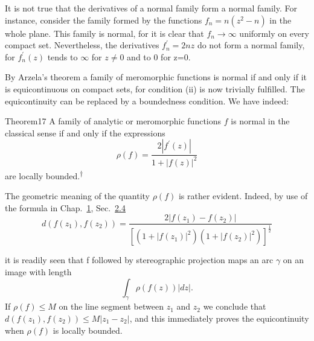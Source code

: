 It is not true that the derivatives of a normal family form a normal family. For instance, consider the family formed by the functions $f_{n}=n(z^{2}-n)$ in the whole plane. This family is normal, for it is clear that $f_{n}\to\infty$ uniformly on every compact set. Nevertheless, the derivatives $f_{n}^{\prime}=2nz$ do not form a normal family, for $f_{n}^{\prime}(z)$ tends to $\infty$ for $z\neq0$ and to 0 for z=0.

By Arzela's theorem a family of meromorphic functions is normal if and only if it is equicontinuous on compact sets, for condition (ii) is now trivially fulfilled. The equicontinuity can be replaced by a boundedness condition. We have indeed:

\begin{originalstatement}{Theorem}{17}\label{thm:5.17}
A family of analytic or meromorphic functions $f$ is normal in the classical sense if and only if the expressions
\begin{equation*}
\rho (f) = \frac {2 | f ^ {\prime} (z) |}{1 + | f (z) | ^ {2}}\tag{58}\label{eq:5.58-p242-b7}
\end{equation*}
are locally bounded.\hyperlink{fn:242:dagger}{\textsuperscript{\ensuremath{\dagger}}}
\end{originalstatement}

The geometric meaning of the quantity $\rho(f)$ is rather evident. Indeed, by use of the formula in Chap.~\hyperref[chap:1]{1}, Sec.~\hyperref[sec:1.2.4]{2.4}
\begin{equation*}
d (f (z _ {1}), f (z _ {2})) = \frac {2 | f (z _ {1}) - f (z _ {2}) |}{[ (1 + | f (z _ {1}) | ^ {2}) (1 + | f (z _ {2}) | ^ {2}) ] ^ {\frac {1}{2}}}
\end{equation*}
\begingroup\renewcommand{\thefootnote}{}\endgroup

it is readily seen that f followed by stereographic projection maps an arc $\gamma$ on an image with length
\begin{equation*}
\int_ {\gamma} \rho (f (z)) | d z |.
\end{equation*}
If $\rho(f) \leq M$ on the line segment between $z_1$ and $z_2$ we conclude that $d(f(z_1), f(z_2)) \leq M |z_1 - z_2|$, and this immediately proves the equicontinuity when $\rho(f)$ is locally bounded.

